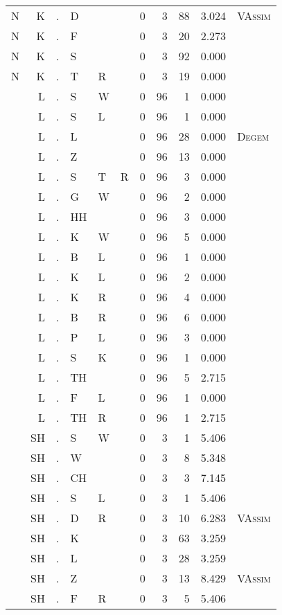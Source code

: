 \begin{longtable}{r@{ } r@{ } c@{ } l@{ } l@{ } l@{ } r r r r l }
N & K & . & D &  &  & 0 & 3 & 88 & 3.024 & \textsc{VAssim} \\
N & K & . & F &  &  & 0 & 3 & 20 & 2.273 &  \\
N & K & . & S &  &  & 0 & 3 & 92 & 0.000 &  \\
N & K & . & T & R &  & 0 & 3 & 19 & 0.000 &  \\
 & L & . & S & W &  & 0 & 96 & 1 & 0.000 &  \\
 & L & . & S & L &  & 0 & 96 & 1 & 0.000 &  \\
 & L & . & L &  &  & 0 & 96 & 28 & 0.000 & \textsc{Degem} \\
 & L & . & Z &  &  & 0 & 96 & 13 & 0.000 &  \\
 & L & . & S & T & R & 0 & 96 & 3 & 0.000 &  \\
 & L & . & G & W &  & 0 & 96 & 2 & 0.000 &  \\
 & L & . & HH &  &  & 0 & 96 & 3 & 0.000 &  \\
 & L & . & K & W &  & 0 & 96 & 5 & 0.000 &  \\
 & L & . & B & L &  & 0 & 96 & 1 & 0.000 &  \\
 & L & . & K & L &  & 0 & 96 & 2 & 0.000 &  \\
 & L & . & K & R &  & 0 & 96 & 4 & 0.000 &  \\
 & L & . & B & R &  & 0 & 96 & 6 & 0.000 &  \\
 & L & . & P & L &  & 0 & 96 & 3 & 0.000 &  \\
 & L & . & S & K &  & 0 & 96 & 1 & 0.000 &  \\
 & L & . & TH &  &  & 0 & 96 & 5 & 2.715 &  \\
 & L & . & F & L &  & 0 & 96 & 1 & 0.000 &  \\
 & L & . & TH & R &  & 0 & 96 & 1 & 2.715 &  \\
 & SH & . & S & W &  & 0 & 3 & 1 & 5.406 &  \\
 & SH & . & W &  &  & 0 & 3 & 8 & 5.348 &  \\
 & SH & . & CH &  &  & 0 & 3 & 3 & 7.145 &  \\
 & SH & . & S & L &  & 0 & 3 & 1 & 5.406 &  \\
 & SH & . & D & R &  & 0 & 3 & 10 & 6.283 & \textsc{VAssim} \\
 & SH & . & K &  &  & 0 & 3 & 63 & 3.259 &  \\
 & SH & . & L &  &  & 0 & 3 & 28 & 3.259 &  \\
 & SH & . & Z &  &  & 0 & 3 & 13 & 8.429 & \textsc{VAssim} \\
 & SH & . & F & R &  & 0 & 3 & 5 & 5.406 &  \\

\end{longtable}
